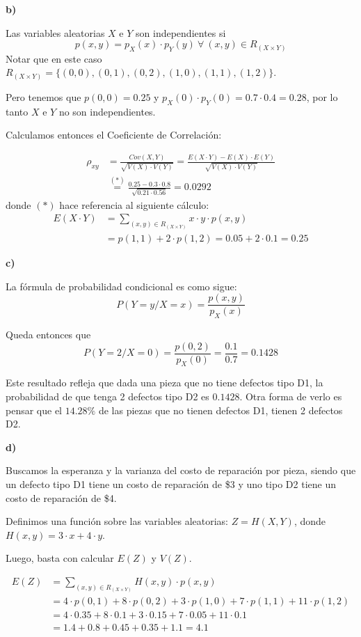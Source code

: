 \documentclass[11pt]{article}
\begin{document}
\textbf{b)}

Las variables aleatorias $X$ e $Y$ son independientes si $$p(x,y) = p_X(x) \cdot p_Y(y) \ \forall\ (x,y) \in R_{(X \times Y)}$$
Notar que en este caso $R_{(X \times Y)} = \{(0,0),(0,1),(0,2),(1,0),(1,1),(1,2)\}$.

Pero tenemos que $p(0,0) = 0.25$ y $p_X(0) \cdot p_Y(0) = 0.7 \cdot 0.4 = 0.28$, por lo tanto $X$ e $Y$ no son independientes. 

Calculamos entonces el Coeficiente de Correlaci\'on:

\begin{align*}
    \rho_{xy} &= \frac{Cov(X,Y)}{\sqrt{V(X) \cdot V(Y)}} = \frac{E(X \cdot Y) - E(X) \cdot E(Y)}{\sqrt{V(X) \cdot V(Y)}} \\
              &\stackrel{(*)}{=} \frac{0.25 - 0.3 \cdot 0.8}{\sqrt{0.21 \cdot 0.56}} = 0.0292
\end{align*}
donde $(*)$ hace referencia al siguiente c\'alculo:
\begin{align*}
    E(X \cdot Y) &= \sum_{(x,y) \in R_{(X \times Y)}} x \cdot y \cdot p(x,y) \\
                 &= p(1,1) + 2 \cdot p(1,2) = 0.05 + 2 \cdot 0.1 = 0.25 
\end{align*}


\textbf{c)}

La f\'ormula de probabilidad condicional es como sigue:
$$P(Y=y / X=x) = \frac{p(x,y)}{p_X(x)}$$

Queda entonces que
$$P(Y=2 / X=0) = \frac{p(0,2)}{p_X(0)} = \frac{0.1}{0.7} = 0.1428$$

Este resultado refleja que dada una pieza que no tiene defectos tipo D1, la probabilidad de que tenga 2 defectos tipo D2 es $0.1428$. 
Otra forma de verlo es pensar que el $14.28\%$ de las piezas que no tienen defectos D1, tienen 2 defectos D2.


\textbf{d)}

Buscamos la esperanza y la varianza del costo de reparaci\'on por pieza, siendo que un defecto tipo D1 tiene un costo de reparaci\'on de \$3 y uno tipo D2 tiene un costo de reparaci\'on de \$4.

Definimos una funci\'on sobre las variables aleatorias: $Z = H(X,Y)$, donde $H(x,y) = 3 \cdot x + 4 \cdot y$.

Luego, basta con calcular $E(Z)$ y $V(Z)$.

\begin{align*}
    E(Z) &= \sum_{(x,y) \in R_{(X \times Y)}} H(x,y) \cdot p(x,y) \\ 
         &= 4 \cdot p(0,1) + 8 \cdot p(0,2) + 3 \cdot p(1,0) + 7 \cdot p(1,1) + 11 \cdot p(1,2) \\
         &= 4 \cdot 0.35 + 8 \cdot 0.1 + 3 \cdot 0.15 + 7 \cdot 0.05 + 11 \cdot 0.1 \\
         &= 1.4 + 0.8 + 0.45 + 0.35 + 1.1 = 4.1
\end{align*}
\end{document}
